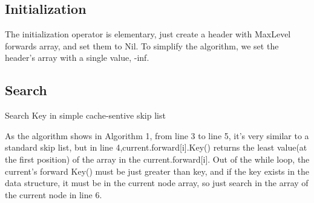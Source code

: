 \documentclass{article}
\begin{document}
\subsection{Initialization}
The initialization operator is elementary, just create a header with MaxLevel forwards array, and set them to Nil. To simplify the algorithm, we set the header's array with a single value, -inf.


\subsection{Search}
\begin{algorithm}[H]
    \caption{Search Key in simple cache-sentive skip list}
    \end{algorithm}

As the algorithm shows in Algorithm 1, from line 3 to line 5, it’s very similar to a standard skip list, but in line 4,current.forward[i].Key() returns the least value(at the first position) of the array in the current.forward[i]. Out of the while loop, the current’s forward Key() must be just greater than key, and if the key exists in the data structure, it must be in the current node array, so just search in the array of the current node in line 6.
\end{document}

